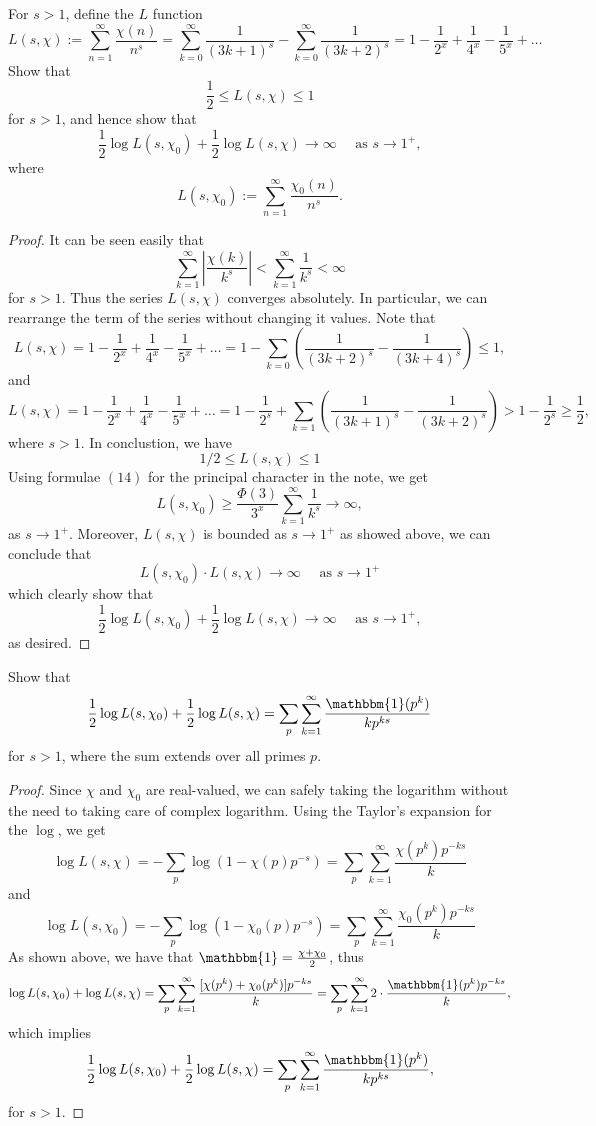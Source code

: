 \documentclass[11pt,letterpaper]{article}
\DeclareMathOperator{\1}{\mathbbm{1}}
\begin{document}
\begin{exercise}
  For $s>1$, define the $L$ function
  \[L(s,\chi):= \sum_{n=1}^\infty \dfrac{\chi(n)}{n^s} = \sum_{k=0}^\infty \dfrac{1}{(3k+1)^s}-\sum_{k=0}^\infty \dfrac{1}{(3k+2)^s} = 1- \dfrac{1}{2^x}+\dfrac{1}{4^x}-\dfrac{1}{5^x}+\ldots \]
  Show that
  \[\dfrac{1}{2} \le L(s,\chi) \le 1\]
  for $s>1$, and hence show that
  \[\dfrac{1}{2} \log L(s,\chi_0) + \dfrac{1}{2}\log L(s,\chi) \to \infty \quad \text{ as } s \to 1^+,\]
  where
  \[L(s,\chi_0):= \sum_{n=1}^\infty \dfrac{\chi_0(n)}{n^s}.\]
\end{exercise}
\begin{proof}
  It can be seen easily that
  \[\sum_{k=1}^\infty \left|\dfrac{\chi(k)}{k^s}\right|< \sum_{k=1}^\infty \dfrac{1}{k^s}<\infty\]
  for $s>1$. Thus the series $L(s,\chi)$ converges absolutely. In particular, we can rearrange the term of the series
  without changing it values. Note that
  \[L(s,\chi) = 1- \dfrac{1}{2^x}+\dfrac{1}{4^x}-\dfrac{1}{5^x}+\ldots = 1-\sum_{k=0}\left(\dfrac{1}{(3k+2)^s}-\dfrac{1}{(3k+4)^s}\right) \le 1,\]
  and
  \[L(s,\chi) = 1- \dfrac{1}{2^x}+\dfrac{1}{4^x}-\dfrac{1}{5^x}+\ldots = 1-\dfrac{1}{2^s}+\sum_{k=1}\left(\dfrac{1}{(3k+1)^s}-\dfrac{1}{(3k+2)^s}\right)>1-\dfrac{1}{2^s}\ge \dfrac{1}{2},\]
  where $s>1$. In conclustion, we have
  \[1/2 \le L(s,\chi) \le 1 \]
  Using formulae $(14)$ for the principal character in the note, we get
  \[ L(s,\chi_0) \ge \dfrac{\Phi(3)}{3^x}\sum_{k=1}^\infty \dfrac{1}{k^s} \longrightarrow \infty,\]
  as $s \to 1^+$. Moreover, $L(s,\chi)$ is bounded as $s \to 1^+$ as showed above, we can conclude that
  \[L(s,\chi_0) \cdot L(s,\chi) \to \infty \quad \text{ as } s \to 1^+\]
  which clearly show that
  \[\dfrac{1}{2} \log L(s,\chi_0) + \dfrac{1}{2}\log L(s,\chi) \to \infty \quad \text{ as } s \to 1^+,\]
  as desired.
\end{proof}


\newpage
\begin{exercise}
  Show that
  \[\dfrac{1}{2}\log L(s,\chi_0)+ \dfrac{1}{2}\log L(s,\chi) = \sum_{p}\sum_{k=1}^\infty \dfrac{\mathbbm{1}(p^k)}{kp^{ks}}\]
  for $s>1$, where the sum extends over all primes $p$.
\end{exercise}
\begin{proof}
  Since $\chi$ and $\chi_0$ are real-valued, we can safely taking the logarithm without the need to taking care of
  complex logarithm. Using the Taylor's expansion for the $\log$, we get
  \[ \log L(s,\chi) = - \sum_{p} \log(1-\chi(p)p^{-s}) = \sum_{p}\sum_{k=1}^\infty \dfrac{\chi(p^k)p^{-ks}}{k}\]
  and
  \[ \log L(s,\chi_0) = - \sum_{p} \log(1-\chi_0(p)p^{-s}) = \sum_{p}\sum_{k=1}^\infty \dfrac{\chi_0(p^k)p^{-ks}}{k}\]
  As shown above, we have that $\mathbbm{1}= \frac{\chi+\chi_0}{2}$, thus
  \[\log L(s,\chi_0)+ \log L(s,\chi) =\sum_{p}\sum_{k=1}^\infty \dfrac{[\chi(p^k)+\chi_0(p^k)]p^{-ks}}{k}= \sum_{p}\sum_{k=1}^\infty 2\cdot \dfrac{\mathbbm{1}(p^k)p^{-ks}}{k},\]
  which implies
  \[\dfrac{1}{2}\log L(s,\chi_0)+ \dfrac{1}{2}\log L(s,\chi) = \sum_{p}\sum_{k=1}^\infty \dfrac{\mathbbm{1}(p^k)}{kp^{ks}},\]
  for $s>1$.
\end{proof}
\end{document}
